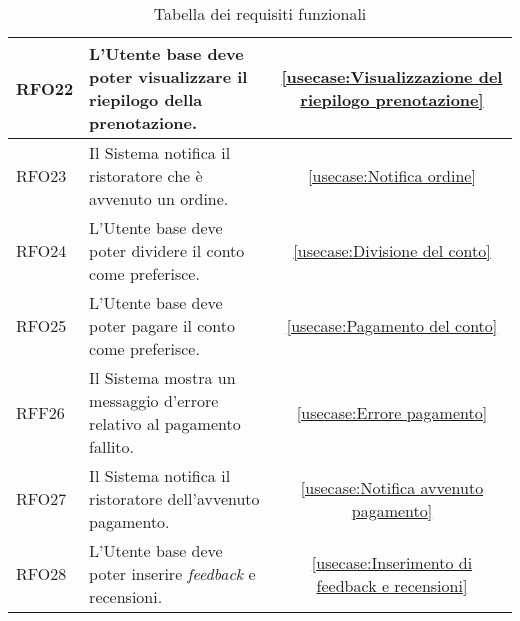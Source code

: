\begin{table}[H]
\begin{tabularx}{\textwidth}{l|X|c}
		\hline
		RFO22       & L'Utente base deve poter visualizzare il riepilogo della prenotazione.                          				 				&  \autoref{usecase:Visualizzazione del riepilogo prenotazione}           \\
		\hline
		RFO23       & Il Sistema notifica il ristoratore che è avvenuto un ordine.                          				 						&  \autoref{usecase:Notifica ordine}           \\
		\hline
		RFO24       & L'Utente base deve poter dividere il conto come preferisce.												       				 &  \autoref{usecase:Divisione del conto}           \\
		\hline
		RFO25       & L'Utente base deve poter pagare il conto come preferisce.												       				 	&  \autoref{usecase:Pagamento del conto}           \\
		\hline
		RFF26       & Il Sistema mostra un messaggio d'errore relativo al pagamento fallito.												       	&  \autoref{usecase:Errore pagamento}           \\
		\hline
		RFO27       & Il Sistema notifica il ristoratore dell'avvenuto pagamento.												       				 &  \autoref{usecase:Notifica avvenuto pagamento}           \\
		\hline
		RFO28       & L'Utente base deve poter inserire \textit{feedback} e recensioni.												       			 &  \autoref{usecase:Inserimento di feedback e recensioni}           \\
		\hline
\end{tabularx}
\caption{Tabella dei requisiti funzionali}
\end{table}


